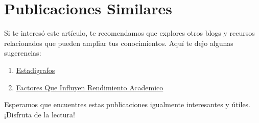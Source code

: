 \documentclass[
  jou,
  floatsintext,
  longtable,
  a4paper,
  nolmodern,
  notxfonts,
  notimes,
  colorlinks=true,linkcolor=blue,citecolor=blue,urlcolor=blue]{apa7}
\providecommand{\tightlist}{%
  \setlength{\itemsep}{0pt}\setlength{\parskip}{0pt}}
\begin{document}
\begin{ThreePartTable}
\end{ThreePartTable}

\section{Publicaciones Similares}\label{publicaciones-similares}

Si te interesó este artículo, te recomendamos que explores otros blogs y
recursos relacionados que pueden ampliar tus conocimientos. Aquí te dejo
algunas sugerencias:

\begin{enumerate}
\def\labelenumi{\arabic{enumi}.}
\tightlist
\item
  \href{https://achalmaedison.netlify.app/econometria/estadistica/2018-05-16-estadigrafos/index.pdf}{}
  \href{https://achalmaedison.netlify.app/econometria/estadistica/2018-05-16-estadigrafos}{Estadigrafos}
\item
  \href{https://achalmaedison.netlify.app/econometria/estadistica/2018-12-26-factores-que-influyen-rendimiento-academico/index.pdf}{}
  \href{https://achalmaedison.netlify.app/econometria/estadistica/2018-12-26-factores-que-influyen-rendimiento-academico}{Factores
  Que Influyen Rendimiento Academico}
\end{enumerate}

Esperamos que encuentres estas publicaciones igualmente interesantes y
útiles. ¡Disfruta de la lectura!
\end{document}
